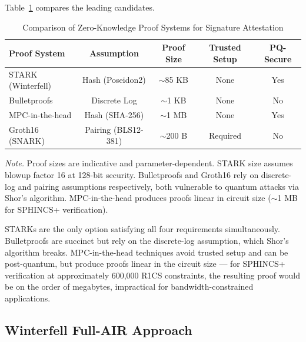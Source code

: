 \documentclass[11pt,a4paper]{article}
\begin{document}
Table~\ref{tab:proofcompare} compares the leading candidates.

\begin{table}[t]
\centering
\caption{Comparison of Zero-Knowledge Proof Systems for Signature Attestation}
\label{tab:proofcompare}
\begin{threeparttable}
\begin{tabular}{lcccc}
\toprule
\textbf{Proof System} & \textbf{Assumption} & \textbf{Proof Size} & \textbf{Trusted Setup} & \textbf{PQ-Secure} \\
\midrule
STARK (Winterfell) & Hash (Poseidon2) & $\sim$85 KB & None & Yes \\
Bulletproofs \cite{Bunz2018Bulletproofs} & Discrete Log & $\sim$1 KB & None & No \\
MPC-in-the-head \cite{Katz2018ImprovedNIZK} & Hash (SHA-256) & $\sim$1 MB & None & Yes \\
Groth16 (SNARK) & Pairing (BLS12-381) & $\sim$200 B & Required & No \\
\bottomrule
\end{tabular}
\begin{tablenotes}
\small
\item \emph{Note.}  Proof sizes are indicative and parameter-dependent.  STARK size assumes
blowup factor 16 at 128-bit security.  Bulletproofs and Groth16 rely on discrete-log and
pairing assumptions respectively, both vulnerable to quantum attacks via Shor's algorithm.
MPC-in-the-head produces proofs linear in circuit size ($\sim$1 MB for SPHINCS+ verification).
\end{tablenotes}
\end{threeparttable}
\end{table}

STARKs are the only option satisfying all four requirements simultaneously.
Bulletproofs \cite{Bunz2018Bulletproofs} are succinct but rely on the discrete-log
assumption, which Shor's algorithm breaks.  MPC-in-the-head techniques \cite{Katz2018ImprovedNIZK}
avoid trusted setup and can be post-quantum, but produce proofs linear in the circuit size
--- for SPHINCS+ verification at approximately 600,000 R1CS constraints, the resulting proof
would be on the order of megabytes, impractical for bandwidth-constrained applications.

\subsection{Winterfell Full-AIR Approach}
\end{document}
